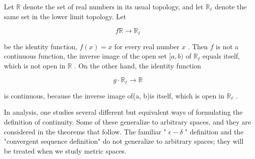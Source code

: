 \begin{example} Let \(\mathbb{R}\) denote the set of real numbers in its usual topology, and let \({\mathbb{R}}_{\ell }\) denote the same set in the lower limit topology. Let

\[
f\mathbb{R} \rightarrow  {\mathbb{R}}_{\ell }
\]

be the identity function, \(f\left( x\right)  = x\) for every real number \(x\) . Then \(f\) is not a continuous function, the inverse image of the open set \(\lbrack a,b)\) of \({\mathbb{R}}_{\ell }\) equals itself, which is not open in \(\mathbb{R}\) . On the other hand, the identity function

\[
g \cdot  {\mathbb{R}}_{\ell } \rightarrow  \mathbb{R}
\]

is continuous, because the inverse image of(a, b)is itself, which is open in \({\mathbb{R}}_{\ell }\) .
\end{example}

In analysis, one studies several different but equivalent ways of formulating the definition of continuity. Some of these generalize to arbitrary spaces, and they are considered in the theorems that follow. The familiar " \(\epsilon  - \delta\) " definition and the "convergent sequence definition" do not generalize to arbitrary spaces; they will be treated when we study metric spaces.

